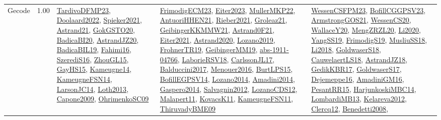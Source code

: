 {\begin{longtable}{p{3cm}r>{\raggedright\arraybackslash}p{6cm}>{\raggedright\arraybackslash}p{6cm}>{\raggedright\arraybackslash}p{8cm}}
\index{Gecode}\index{CPSystems!Gecode}Gecode &  1.00 & \hyperref[detail:TardivoDFMP23]{TardivoDFMP23}, \hyperref[detail:Doolaard2022]{Doolaard2022}, \hyperref[detail:Spieker2021]{Spieker2021}, \hyperref[detail:Astrand21]{Astrand21}, \hyperref[detail:GokGSTO20]{GokGSTO20}, \hyperref[detail:BadicaBI20]{BadicaBI20}, \hyperref[detail:AstrandJZ20]{AstrandJZ20}, \hyperref[detail:BadicaBIL19]{BadicaBIL19}, \hyperref[detail:Fahimi16]{Fahimi16}, \hyperref[detail:SzerediS16]{SzerediS16}, \hyperref[detail:ZhouGL15]{ZhouGL15}, \hyperref[detail:GayHS15]{GayHS15}, \hyperref[detail:Kameugne14]{Kameugne14}, \hyperref[detail:KameugneFSN14]{KameugneFSN14}, \hyperref[detail:LarsonJC14]{LarsonJC14}, \hyperref[detail:Loth2013]{Loth2013}, \hyperref[detail:Capone2009]{Capone2009}, \hyperref[detail:OhrimenkoSC09]{OhrimenkoSC09} & \hyperref[detail:FrimodigECM23]{FrimodigECM23}, \hyperref[detail:Eiter2023]{Eiter2023}, \hyperref[detail:MullerMKP22]{MullerMKP22}, \hyperref[detail:AntuoriHHEN21]{AntuoriHHEN21}, \hyperref[detail:Rieber2021]{Rieber2021}, \hyperref[detail:Groleaz21]{Groleaz21}, \hyperref[detail:GeibingerKKMMW21]{GeibingerKKMMW21}, \hyperref[detail:Astrand0F21]{Astrand0F21}, \hyperref[detail:Eiter2021]{Eiter2021}, \hyperref[detail:Astrand2020]{Astrand2020}, \hyperref[detail:Lozano2019]{Lozano2019}, \hyperref[detail:FrohnerTR19]{FrohnerTR19}, \hyperref[detail:GeibingerMM19]{GeibingerMM19}, \hyperref[detail:abs-1911-04766]{abs-1911-04766}, \hyperref[detail:LaborieRSV18]{LaborieRSV18}, \hyperref[detail:CarlssonJL17]{CarlssonJL17}, \hyperref[detail:Balduccini2017]{Balduccini2017}, \hyperref[detail:Menouer2016]{Menouer2016}, \hyperref[detail:BurtLPS15]{BurtLPS15}, \hyperref[detail:BofillEGPSV14]{BofillEGPSV14}, \hyperref[detail:Lozano2014]{Lozano2014}, \hyperref[detail:Amadini2014]{Amadini2014}, \hyperref[detail:Gaspero2014]{Gaspero2014}, \hyperref[detail:Salvagnin2012]{Salvagnin2012}, \hyperref[detail:LozanoCDS12]{LozanoCDS12}, \hyperref[detail:Malapert11]{Malapert11}, \hyperref[detail:KovacsK11]{KovacsK11}, \hyperref[detail:KameugneFSN11]{KameugneFSN11}, \hyperref[detail:ThiruvadyBME09]{ThiruvadyBME09} & \hyperref[detail:WessenCSFPM23]{WessenCSFPM23}, \hyperref[detail:BofillCGGPSV23]{BofillCGGPSV23}, \hyperref[detail:ArmstrongGOS21]{ArmstrongGOS21}, \hyperref[detail:WessenCS20]{WessenCS20}, \hyperref[detail:WallaceY20]{WallaceY20}, \hyperref[detail:MengZRZL20]{MengZRZL20}, \hyperref[detail:Li2020]{Li2020}, \hyperref[detail:YangSS19]{YangSS19}, \hyperref[detail:FrimodigS19]{FrimodigS19}, \hyperref[detail:MusliuSS18]{MusliuSS18}, \hyperref[detail:Li2018]{Li2018}, \hyperref[detail:GoldwaserS18]{GoldwaserS18}, \hyperref[detail:CauwelaertLS18]{CauwelaertLS18}, \hyperref[detail:AstrandJZ18]{AstrandJZ18}, \hyperref[detail:GedikKBR17]{GedikKBR17}, \hyperref[detail:GoldwaserS17]{GoldwaserS17}, \hyperref[detail:Dejemeppe16]{Dejemeppe16}, \hyperref[detail:AmadiniGM16]{AmadiniGM16}, \hyperref[detail:PesantRR15]{PesantRR15}, \hyperref[detail:HarjunkoskiMBC14]{HarjunkoskiMBC14}, \hyperref[detail:LombardiMB13]{LombardiMB13}, \hyperref[detail:Kelareva2012]{Kelareva2012}, \hyperref[detail:Clercq12]{Clercq12}, \hyperref[detail:Benedetti2008]{Benedetti2008}, 
\end{longtable}}
